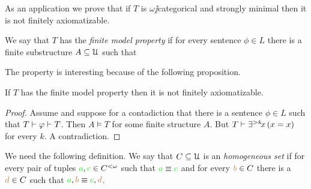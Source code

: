 \documentclass[creche.tex]{subfiles}
\begin{document}
As an application we prove that if $T$ is $\omega\jj$categorical and strongly minimal then it is not finitely axiomatizable.

We say that $T$ has the \emph{finite model property\/} if for every sentence $\phi\in L$ there is a finite substructure $A\subseteq\EuScript U$ such that 


The property is interesting because of the following proposition.

\begin{proposition}\label{prop_fmp_fa}
If $T$ has the finite model property then it is not finitely axiomatizable.
\end{proposition}
\begin{proof}
Assume  and suppose for a contadiction that there is a sentence $\phi\in L$ such that $T\vdash\varphi\vdash T$. Then $A\models T$ for some finite structure $A$. But $T\vdash \exists^{>k}\!x\,(x=x)$ for every $k$. A contradiction.
\end{proof}
We need the following definition. We say that $C\subseteq\EuScript U$ is an \emph{homogeneous set\/} if for every pair of tuples  ${\color{green} a},{\color{green} c}\in C^{<\omega}$ such that ${\color{green} a}\equiv{\color{green}c}$ and for every ${\color{brown} b}\in C$ there is a ${\color{brown} d}\in C$ such that ${\color{green} a},{\color{brown} b}\equiv {\color{green}c},{\color{brown} d}$.
\end{document}
